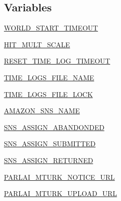 \subsection*{Variables}
\begin{DoxyCompactItemize}
\item 
\hyperlink{namespaceparlai_1_1mturk_1_1core_1_1dev_1_1mturk__manager_a6e891aab76dedb15a1e3bbc33b1eb71c}{W\+O\+R\+L\+D\+\_\+\+S\+T\+A\+R\+T\+\_\+\+T\+I\+M\+E\+O\+UT}
\item 
\hyperlink{namespaceparlai_1_1mturk_1_1core_1_1dev_1_1mturk__manager_ac9049bbf20ef42080333a67c912fdfb0}{H\+I\+T\+\_\+\+M\+U\+L\+T\+\_\+\+S\+C\+A\+LE}
\item 
\hyperlink{namespaceparlai_1_1mturk_1_1core_1_1dev_1_1mturk__manager_abe0b6a38015ef7be98ce8cdb8953fbe6}{R\+E\+S\+E\+T\+\_\+\+T\+I\+M\+E\+\_\+\+L\+O\+G\+\_\+\+T\+I\+M\+E\+O\+UT}
\item 
\hyperlink{namespaceparlai_1_1mturk_1_1core_1_1dev_1_1mturk__manager_ae4405d35680b9ec4beb71ee3684d5430}{T\+I\+M\+E\+\_\+\+L\+O\+G\+S\+\_\+\+F\+I\+L\+E\+\_\+\+N\+A\+ME}
\item 
\hyperlink{namespaceparlai_1_1mturk_1_1core_1_1dev_1_1mturk__manager_a6b2af051f8540ce3c4692aaa1630df06}{T\+I\+M\+E\+\_\+\+L\+O\+G\+S\+\_\+\+F\+I\+L\+E\+\_\+\+L\+O\+CK}
\item 
\hyperlink{namespaceparlai_1_1mturk_1_1core_1_1dev_1_1mturk__manager_a11c781ee900111aeb372ec9c6b69e682}{A\+M\+A\+Z\+O\+N\+\_\+\+S\+N\+S\+\_\+\+N\+A\+ME}
\item 
\hyperlink{namespaceparlai_1_1mturk_1_1core_1_1dev_1_1mturk__manager_a631d926b1e2911879a37fc503d93d744}{S\+N\+S\+\_\+\+A\+S\+S\+I\+G\+N\+\_\+\+A\+B\+A\+N\+D\+O\+N\+D\+ED}
\item 
\hyperlink{namespaceparlai_1_1mturk_1_1core_1_1dev_1_1mturk__manager_a808640818e1a7af7ad335420d55215f5}{S\+N\+S\+\_\+\+A\+S\+S\+I\+G\+N\+\_\+\+S\+U\+B\+M\+I\+T\+T\+ED}
\item 
\hyperlink{namespaceparlai_1_1mturk_1_1core_1_1dev_1_1mturk__manager_afcac826dc4542dcccf448a12ca558318}{S\+N\+S\+\_\+\+A\+S\+S\+I\+G\+N\+\_\+\+R\+E\+T\+U\+R\+N\+ED}
\item 
\hyperlink{namespaceparlai_1_1mturk_1_1core_1_1dev_1_1mturk__manager_add475e9472130f8701c0ca04605f8942}{P\+A\+R\+L\+A\+I\+\_\+\+M\+T\+U\+R\+K\+\_\+\+N\+O\+T\+I\+C\+E\+\_\+\+U\+RL}
\item 
\hyperlink{namespaceparlai_1_1mturk_1_1core_1_1dev_1_1mturk__manager_a3616bcd6c50da0d4ccf7296cb5037c17}{P\+A\+R\+L\+A\+I\+\_\+\+M\+T\+U\+R\+K\+\_\+\+U\+P\+L\+O\+A\+D\+\_\+\+U\+RL}

\end{DoxyCompactItemize}
